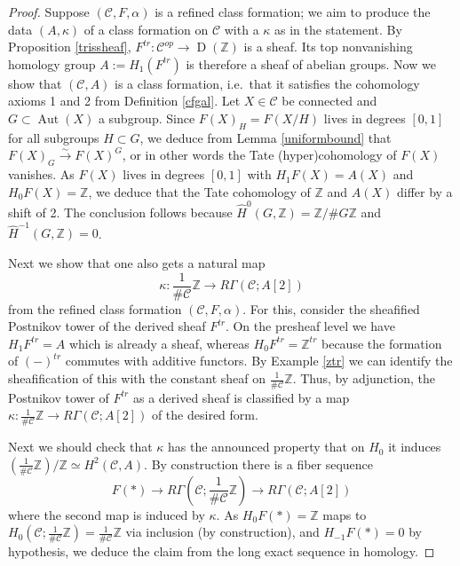 \documentclass[12pt]{article}
\theoremstyle{definition}
\newcommand{\on}{\operatorname}
\newcommand{\mc}{\mathcal}
\newcommand{\mbb}{\mathbb}
\newcommand{\wh}{\widehat}
\begin{document}
\begin{proof}
Suppose $(\mc{C},F,\alpha)$ is a refined class formation; we aim to produce the data $(A,\kappa)$ of a class formation on $\mc{C}$ with a $\kappa$ as in the statement.  By Proposition \ref{trissheaf}, $F^{tr}:\mc{C}^{op}\to\on{D}(\mbb{Z})$ is a sheaf.  Its top nonvanishing homology group $A:=H_1(F^{tr})$ is therefore a sheaf of abelian groups.  Now we show that $(\mc{C},A)$ is a class formation, i.e.\ that it satisfies the cohomology axioms 1 and 2 from Definition \ref{cfgal}.  Let $X\in\mc{C}$ be connected and $G\subset\on{Aut}(X)$ a subgroup.  Since $F(X)_H=F(X/H)$ lives in degrees $[0,1]$ for all subgroups $H\subset G$, we deduce from Lemma \ref{uniformbound} that $F(X)_G\overset{\sim}{\rightarrow}F(X)^G$, or in other words the Tate (hyper)cohomology of $F(X)$ vanishes.  As $F(X)$ lives in degrees $[0,1]$ with $H_1F(X)=A(X)$ and $H_0F(X)=\mbb{Z}$, we deduce that the Tate cohomology of $\mbb{Z}$ and $A(X)$ differ by a shift of 2.  The conclusion follows because $\wh{H}^0(G,\mbb{Z})=\mbb{Z}/\# G\mbb{Z}$ and $\wh{H}^{-1}(G,\mbb{Z})=0$.

Next we show that one also gets a natural map
$$\kappa:\frac{1}{\#\mc{C}}\mbb{Z} \to R\Gamma(\mc{C};A[2])$$
from the refined class formation $(\mc{C},F,\alpha)$.  For this, consider the sheafified Postnikov tower of the derived sheaf $F^{tr}$.  On the presheaf level we have $H_1F^{tr}=A$ which is already a sheaf, whereas $H_0F^{tr}=\mbb{Z}^{tr}$ because the formation of $(-)^{tr}$ commutes with additive functors.  By Example \ref{ztr} we can identify the sheafification of this with the constant sheaf on $\frac{1}{\#\mc{C}}\mbb{Z}$.  Thus, by adjunction, the Postnikov tower of $F^{tr}$ as a derived sheaf is classified by a map $\kappa:\frac{1}{\#\mc{C}}\mbb{Z} \to R\Gamma(\mc{C};A[2])$ of the desired form.

Next we should check that $\kappa$ has the announced property that on $H_0$ it induces $\left(\frac{1}{\#\mc{C}}\mbb{Z}\right)/\mbb{Z}\simeq H^2(\mc{C},A)$.  By construction there is a fiber sequence
$$F(\ast) \to R\Gamma(\mc{C};\frac{1}{\#\mc{C}}\mbb{Z})\to R\Gamma(\mc{C};A[2])$$
where the second map is induced by $\kappa$.  As $H_0F(\ast)=\mbb{Z}$ maps to $H_0(\mc{C};\frac{1}{\#\mc{C}}\mbb{Z})=\frac{1}{\#\mc{C}}\mbb{Z}$ via inclusion (by construction), and $H_{-1}F(\ast)=0$ by hypothesis, we deduce the claim from the long exact sequence in homology.


\end{proof}
\end{document}
